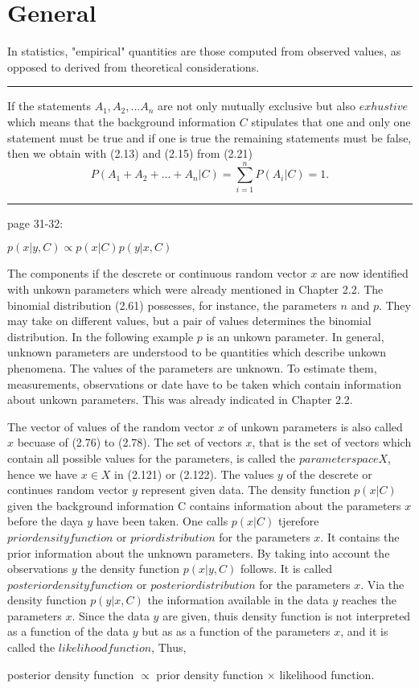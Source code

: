 \documentclass{article}
\begin{document}
\section{General}

In statistics, "empirical" quantities are those computed from observed values, as opposed to derived from theoretical considerations.

\hrule 

\cite{koch2010introduction}If the statements $A_1,A_2,...A_n$ are not only mutually exclusive but also $exhustive$ which means that the background information $C$ stipulates that one and only one statement must be true and if one is true the remaining statements must be false, then we obtain with (2.13) and (2.15) from (2.21)
\begin{equation}\label{eq:exhustive}
P(A_1 + A_2 + ... + A_n | C) = \sum_{i=1}^{n}P(A_i|C) = 1.
\end{equation}

\hrule

\cite{koch2010introduction} page 31-32: 

$p(x|y,C) \propto p(x|C)p(y|x,C)$

The components if the descrete or continuous random vector $x$ are now identified with unkown parameters which were already mentioned in Chapter 2.2. The binomial distribution (2.61) possesses, for instance, the parameters $n$ and $p$. They may take on different values, but a pair of values determines the binomial distribution. In the following example $p$ is an unkown parameter. In general, unknown parameters are understood to be quantities which describe unkown phenomena. The values of the parameters are unknown. To estimate them, measurements, observations or date have to be taken which contain information about unkown parameters. This was already indicated in Chapter 2.2.

The vector of values of the random vector $x$ of unkown parameters is also called $x$ becuase of (2.76) to (2.78). The set of vectors $x$, that is the set of vectors which contain all possible values for the parameters, is called the $parameter space X$, hence we have $x \in X$ in (2.121) or (2.122). The values $y$ of the descrete or continues random vector $y$ represent given data. The density function $p(x|C)$ given the background information C contains information about the parameters $x$ before the daya $y$ have been taken. One calls $p(x|C)$ tjerefore $prior density function$ or $prior distribution$ for the parameters $x$. It contains the prior information about the unknown parameters. By taking into account the observations $y$ the density function $p(x|y,C)$ follows. It is called $posterior density function$ or $posterior distribution$ for the parameters $x$. Via the density function $p(y|x,C)$ the information available in the data $y$ reaches the parameters $x$. Since the data $y$ are given, thuis density function is not interpreted as a function of the data $y$ but as as a function of the parameters $x$, and it is called the $likelihood function$, Thus,

posterior density function $\propto$ prior density function $\times$ likelihood function.





\end{document}
